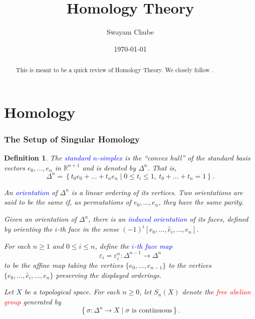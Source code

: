 \documentclass[10pt]{article}
\title{Homology Theory}
\author{Swayam Chube}
\date{\today}
\theoremstyle{thmstyle}
\theoremstyle{defstyle}
\newtheorem{definition}[theorem]{Definition}
\newcommand{\R}{\mathbb{R}}
\newcommand{\wh}[1]{\widehat{#1}}
\newcommand{\define}[1]{\textcolor{blue}{\textit{#1}}}
\newcommand{\important}[1]{\textcolor{red}{\textit{#1}}}
\renewcommand{\le}{\leqslant}
\renewcommand{\ge}{\geqslant}
\begin{document}
\maketitle

\begin{abstract}
    This is meant to be a quick review of Homology Theory. We closely follow \cite{rotman-algtop}.
\end{abstract}

\tableofcontents

\newpage

\part{Homology}

\section{The Setup of Singular Homology}
\begin{definition}
    The \define{standard $n$-simplex} is the ``convex hull'' of the standard basis vectors $e_0,\dots,e_n$ in $\R^{n + 1}$ and is denoted by $\Delta^n$. That is, 
    \begin{equation*}
        \Delta^{n} = \left\{t_0e_0 + \dots + t_ne_n\mid 0\le t_i\le 1,~t_0 + \dots + t_n = 1\right\}.
    \end{equation*}

    An \define{orientation} of $\Delta^n$ is a linear ordering of its vertices. Two orientations are said to be the same if, as permutations of $e_0,\dots,e_n$, they have the same parity.

    Given an orientation of $\Delta^n$, there is an \define{induced orientation} of its faces, defined by orienting the $i$-th face in the sense $(-1)^i [e_0,\dots, \wh e_i,\dots, e_n]$.

    For each $n\ge 1$ and $0\le i\le n$, define the \define{$i$-th face map} 
    \begin{equation*}
        \varepsilon_i = \varepsilon_i^n: \Delta^{n - 1}\to\Delta^n
    \end{equation*}
    to be the affine map taking the vertices $\{e_0,\dots, e_{n - 1}\}$ to the vertices $\{e_0,\dots,\wh e_i,\dots, e_n\}$ preserving the displayed orderings.

    Let $X$ be a topological space. For each $n\ge 0$, let $S_n(X)$ denote the \important{free abelian group} generated by 
    \begin{equation*}
        \left\{\sigma:\Delta^n\to X\mid \sigma\text{ is continuous}\right\}.
    \end{equation*}
\end{definition}
\end{document}
